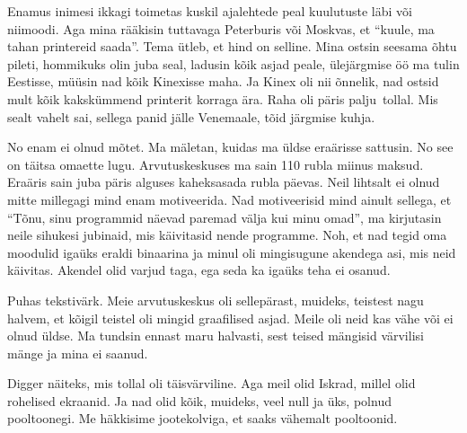
Enamus inimesi ikkagi toimetas kuskil ajalehtede peal kuulutuste läbi või 
niimoodi. Aga mina  rääkisin tuttavaga Peterburis või Moskvas, et 
\enquote{kuule,  ma tahan printereid saada}. Tema ütleb, et hind on selline. 
Mina ostsin seesama õhtu pileti, hommikuks olin juba seal, ladusin kõik asjad 
peale, ülejärgmise öö ma tulin Eestisse, müüsin nad kõik 
Kinexisse maha. Ja Kinex oli 
nii õnnelik, nad ostsid mult kõik kakskümmend printerit korraga ära. Raha oli 
päris palju tollal. Mis sealt vahelt sai, sellega panid jälle Venemaale, tõid 
järgmise kuhja.


No enam ei olnud mõtet. Ma mäletan, kuidas ma üldse eraärisse sattusin. No see 
on täitsa omaette lugu. Arvutuskeskuses ma sain 110 rubla miinus maksud. 
Eraäris sain juba päris alguses kaheksasada rubla päevas. Neil lihtsalt ei 
olnud mitte millegagi mind enam motiveerida. Nad motiveerisid mind ainult 
sellega, et \enquote{Tõnu, sinu programmid näevad paremad välja kui minu omad}, 
ma kirjutasin neile sihukesi jubinaid, mis käivitasid nende programme. Noh, et 
nad tegid oma moodulid igaüks eraldi binaarina ja minul oli mingisugune 
akendega asi, mis neid käivitas. Akendel olid varjud taga, ega seda ka igaüks 
teha ei osanud. 


Puhas tekstivärk. Meie arvutuskeskus oli sellepärast, muideks,  teistest  nagu 
halvem, et kõigil teistel oli mingid graafilised asjad. Meile oli neid kas vähe 
või ei olnud üldse. Ma tundsin ennast maru halvasti, sest teised mängisid 
värvilisi mänge ja mina ei saanud. 


Digger näiteks, mis tollal 
oli täisvärviline. Aga meil olid Iskrad, millel olid rohelised 
ekraanid. Ja nad olid kõik, muideks, veel null ja üks, polnud  pooltoonegi. Me 
häkkisime  jootekolviga, et saaks  vähemalt pooltoonid. 


